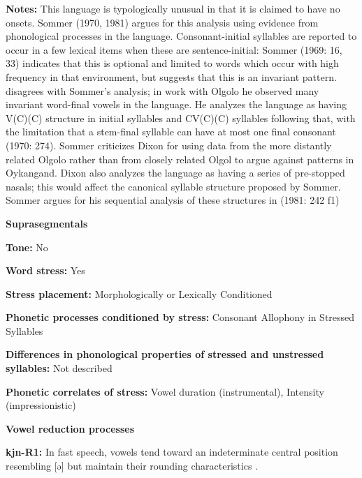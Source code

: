 \textbf{Notes:} This language is typologically unusual in that it is claimed to have no onsets. Sommer (1970, 1981) argues for this analysis using evidence from phonological processes in the language. Consonant-initial syllables are reported to occur in a few lexical items when these are sentence-initial: Sommer (1969: 16, 33) indicates that this is optional and limited to words which occur with high frequency in that environment, but \citet{Sommer1981} suggests that this is an invariant pattern. \citet{Dixon1970} disagrees with Sommer’s analysis; in work with Olgolo he observed many invariant word-final vowels in the language. He analyzes the language as having V(C)(C) structure in initial syllables and CV(C)(C) syllables following that, with the limitation that a stem-final syllable can have at most one final consonant (1970: 274). Sommer criticizes Dixon for using data from the more distantly related Olgolo rather than from closely related Olgol to argue against patterns in Oykangand. Dixon also analyzes the language as having a series of pre-stopped nasals; this would affect the canonical syllable structure proposed by Sommer. Sommer argues for his sequential analysis of these structures in (1981: 242 f1)



\textbf{Suprasegmentals}



\textbf{Tone:} No



\textbf{Word stress:} Yes



\textbf{Stress placement:} Morphologically or Lexically Conditioned



\textbf{Phonetic processes conditioned by stress:} Consonant Allophony in Stressed Syllables



\textbf{Differences in phonological properties of stressed and unstressed syllables:} Not described



\textbf{Phonetic correlates of stress:} Vowel duration (instrumental), Intensity (impressionistic)



\textbf{Vowel reduction processes}



\textbf{kjn-R1:} In fast speech, vowels tend toward an indeterminate central position resembling [ə] but maintain their rounding characteristics \citep[41]{Sommer1969}.



